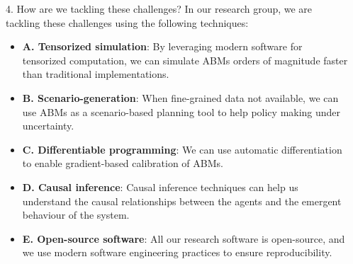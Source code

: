 \documentclass[final,hyperref={pdfpagelabels=false}]{beamer}
\begin{document}
\begin{frame}[t]
\begin{columns}[t]
\begin{column}{.48\textwidth}
    \begin{block}{4. How are we tackling these challenges?}
      In our research group, we are tackling these challenges using the following techniques:
      \begin{itemize}
        \item \justifying \textbf{A. Tensorized simulation}: By leveraging modern software for tensorized computation, we can simulate ABMs orders of magnitude faster than traditional implementations.
        \item \justifying \textbf{B. Scenario-generation}: When fine-grained data not available, we can use ABMs as a scenario-based planning tool to help policy making under uncertainty.
        \item \justifying \textbf{C. Differentiable programming}: We can use automatic differentiation to enable gradient-based calibration of ABMs.
        \item \justifying \textbf{D. Causal inference}: Causal inference techniques can help us understand the causal relationships between the agents and the emergent behaviour of the system.
        \item \justifying \textbf{E. Open-source software}: All our research software is open-source, and we use modern software engineering practices to ensure reproducibility.

      \end{itemize}
    \end{block}

  \end{column} %



  \begin{column}{.02\textwidth}\end{column} %

\end{columns} %


\end{frame}
\end{document}

